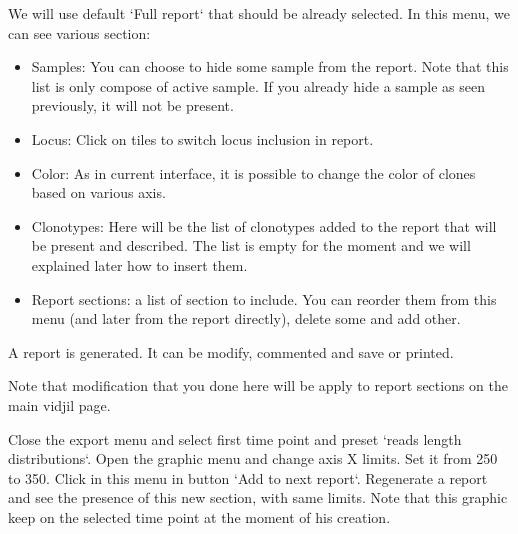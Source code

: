 We will use default `Full report` that should be already selected.
In this menu, we can see various section:
\begin{itemize}
\item Samples: You can choose to hide some sample from the report. Note that this list is only compose of active sample. If you already hide a sample as seen previously, it will not be present.
\item Locus: Click on tiles to switch locus inclusion in report.
\item Color: As in current interface, it is possible to change the color of clones based on various axis.
\item Clonotypes: Here will be the list of clonotypes added to the report that will be present and described. The list is empty for the moment and we will explained later how to insert them.
\item Report sections: a list of section to include. You can reorder them from this menu (and later from the report directly), delete some and add other.
\end{itemize}



A report is generated. It can be modify, commented and save or printed.


Note that modification that you done here will be apply to report sections on the main vidjil page.


Close the export menu and select first time point and preset `reads length distributions`.
Open the graphic menu and change axis X limits. Set it from 250 to 350.
Click in this menu in button `Add to next report`. 
Regenerate a report and see the presence of this new section, with same limits.
Note that this graphic keep on the selected time point at the moment of his creation.

